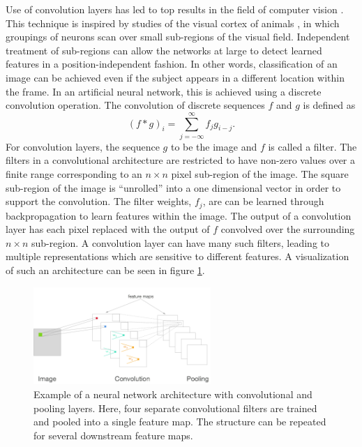 Use of convolution layers has led to top results in the field of computer vision \cite{lecun2010convolutional,krizhevsky2012imagenet}.  This technique is inspired by studies of the visual cortex of animals  \cite{lecun2015deep}, in which groupings of neurons scan over small sub-regions of the visual field.  Independent treatment of sub-regions can allow the networks at large to detect learned features in a position-independent fashion.  In other words, classification of an image can be achieved even if the subject appears in a different location within the frame.  In an artificial neural network, this is achieved using a  discrete convolution operation.  The convolution of discrete sequences $f$ and $g$ is defined as
\begin{equation}
(f*g)_i = \sum_{j = -\infty}^{\infty} f_j g_{i-j}.
\end{equation}
For convolution layers, the sequence $g$ to be the image and $f$ is called a filter.
The filters in a convolutional architecture are restricted to have non-zero values over a finite range corresponding to an $n \times n$ pixel sub-region of the image.
The square sub-region of the image is ``unrolled'' into a one dimensional vector in order to support the convolution.  The filter weights, $f_j$, are can be learned through backpropagation to learn features within the image.  The output of a convolution layer has each pixel replaced with the output of $f$ convolved over the surrounding $n\times n$ sub-region.  A convolution layer can have many such filters, leading to multiple representations which are sensitive to different features.  A visualization of such an architecture can be seen in figure \ref{convnet}.

\begin{figure}[t]
  \begin{center}
    \includegraphics[width=0.6\textwidth]{figures/figures/convnet.png}
  \end{center}
  \caption[Example of a convolutional network architecture]{Example of a neural network architecture with convolutional and pooling layers.  Here, four separate convolutional filters are trained and pooled into a single feature map.  The structure can be repeated for several downstream feature maps.}
  \label{convnet}
\end{figure}

